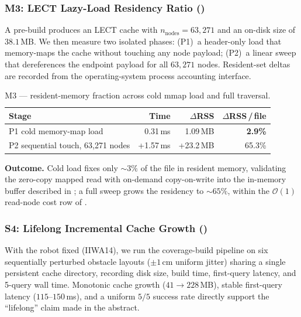 \documentclass[journal]{IEEEtran}
\begin{document}
\subsubsection{M3: LECT Lazy-Load Residency Ratio
()}
A pre-build produces an LECT cache with $n_\text{nodes}=63{,}271$
and an on-disk size of $38.1$\,MB. We then measure two isolated
phases: (P1)~a header-only load that memory-maps the cache without
touching any node payload; (P2)~a linear sweep that dereferences the
endpoint payload for all $63{,}271$ nodes. Resident-set deltas are
recorded from the operating-system process accounting interface.

\begin{table}[ht]
\centering
\caption{M3 — resident-memory fraction across cold mmap load and
full traversal.}
\label{tab:m3_lazy}
\begin{tabular}{@{}lrrr@{}}
\toprule
\textbf{Stage} & \textbf{Time} & $\Delta$\textbf{RSS} & $\Delta$\textbf{RSS}\,/\,file \\
\midrule
P1 cold memory-map load             & 0.31\,ms  & 1.09\,MB & \textbf{2.9\%} \\
P2 sequential touch, 63{,}271 nodes & +1.57\,ms & +23.2\,MB & 65.3\% \\
\bottomrule
\end{tabular}
\end{table}

\textbf{Outcome.} Cold load fixes only $\sim\!3\%$ of the file in
resident memory, validating the zero-copy mapped read with on-demand
copy-on-write into the in-memory buffer described in
; a full sweep grows the residency to
$\sim\!65\%$, within the $\mathcal{O}(1)$ read-node cost row of
.

\subsubsection{S4: Lifelong Incremental Cache Growth
()}
With the robot fixed (IIWA14), we run the coverage-build pipeline on
six sequentially perturbed obstacle layouts
($\pm 1$\,cm uniform jitter) sharing a single persistent cache
directory, recording disk size, build time, first-query latency, and
5-query wall time. Monotonic cache growth
($41\!\to\!228$\,MB), stable first-query latency
($115\text{–}150$\,ms), and a uniform $5/5$ success rate directly
support the ``lifelong'' claim made in the abstract.
\end{document}
